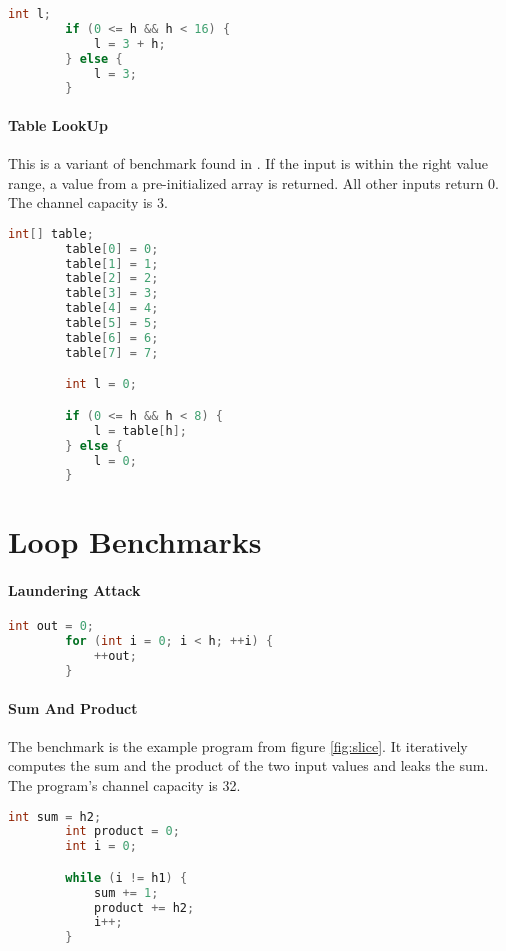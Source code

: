 \begin{center}
    \begin{lstlisting}[language=C, caption=Sanity Check]
        int l;
		if (0 <= h && h < 16) {
			l = 3 + h;
		} else {
			l = 3;
		}
    \end{lstlisting}
\end{center}

\paragraph{Table LookUp} This is a variant of benchmark found in \cite{newsome09}. If the input is within the right value range, a value from a pre-initialized array is returned. All other inputs return 0. The channel capacity is 3.

\begin{center}
    \begin{lstlisting}[language=C, caption=Table LookUp]
        int[] table;
		table[0] = 0;
		table[1] = 1;
		table[2] = 2;
		table[3] = 3;
		table[4] = 4;
		table[5] = 5;
		table[6] = 6;
		table[7] = 7;

		int l = 0;

		if (0 <= h && h < 8) {
			l = table[h];
		} else {
			l = 0;
		}
    \end{lstlisting}
\end{center}

\section{Loop Benchmarks}

\paragraph{Laundering Attack}
\begin{center}
    \begin{lstlisting}[language=C, caption=Laundering Attack]
        int out = 0;
		for (int i = 0; i < h; ++i) {
			++out;
		}
    \end{lstlisting}
\end{center}

\paragraph{Sum And Product}
The benchmark is the example program from figure \ref{fig:slice}. It iteratively computes the sum and the product of the two input values and leaks the sum. The program's channel capacity is 32.

\begin{center}
    \begin{lstlisting}[language=C, caption=Laundering Attack]
        int sum = h2;
		int product = 0;
		int i = 0;

		while (i != h1) {
			sum += 1;
			product += h2;
			i++;
		}
    \end{lstlisting}
\end{center}
